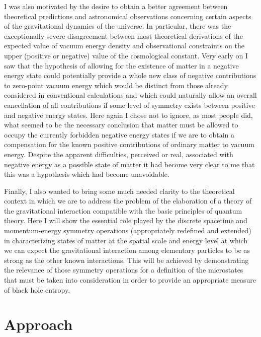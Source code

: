 \documentclass[notitlepage,12pt]{report}
\begin{document}
I was also motivated by the desire to obtain a better agreement between theoretical predictions and astronomical observations concerning certain aspects of the gravitational dynamics of the universe. In particular, there was the exceptionally severe disagreement between most theoretical derivations of the expected value of vacuum energy density and observational constraints on the upper (positive or negative) value of the cosmological constant. Very early on I saw that the hypothesis of allowing for the existence of matter in a negative energy state could potentially provide a whole new class of negative contributions to zero-point vacuum energy which would be distinct from those already considered in conventional calculations and which could naturally allow an overall cancellation of all contributions if some level of symmetry exists between positive and negative energy states. Here again I chose not to ignore, as most people did, what seemed to be the necessary conclusion that matter must be allowed to occupy the currently forbidden negative energy states if we are to obtain a compensation for the known positive contributions of ordinary matter to vacuum energy. Despite the apparent difficulties, perceived or real, associated with negative energy as a possible state of matter it had become very clear to me that this was a hypothesis which had become unavoidable.

Finally, I also wanted to bring some much needed clarity to the theoretical context in which we are to address the problem of the elaboration of a theory of the gravitational interaction compatible with the basic principles of quantum theory. Here I will show the essential role played by the discrete spacetime and momentum-energy symmetry operations (appropriately redefined and extended) in characterizing states of matter at the spatial scale and energy level at which we can expect the gravitational interaction among elementary particles to be as strong as the other known interactions. This will be achieved by demonstrating the relevance of those symmetry operations for a definition of the microstates that must be taken into consideration in order to provide an appropriate measure of black hole entropy.

\section{Approach}
\end{document}

